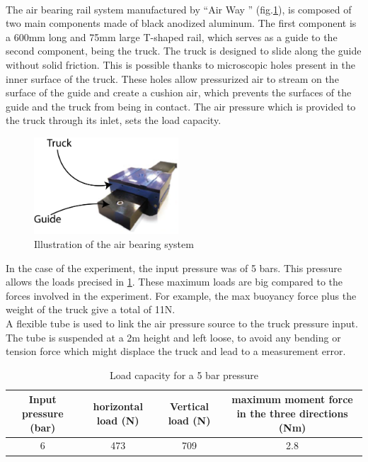 \paragraph{}
The air bearing rail system manufactured by "`Air Way \texttrademark"' (fig.\ref{fig:pic_frictionless}), is composed of two main components made of black anodized aluminum. The first component is a 600mm long and 75mm large T-shaped rail, which serves as a guide to the second component, being the truck. The truck is designed to slide along the guide without solid friction. This is possible thanks to microscopic holes present in the inner surface of the truck. These holes allow pressurized air to stream on the surface of the guide and create a cushion air, which prevents the surfaces of the guide and the truck from being in contact. The air pressure which is provided to the truck through its inlet, sets the load capacity.
\begin{figure}[H] %
	\centering%
	\includegraphics[width=0.48\textwidth]{figures/Chapter_1/Airbearing.png}
	\caption{Illustration of the air bearing system}
	\label{fig:pic_frictionless}
\end{figure}
In the case of the experiment, the input pressure was of 5 bars. This pressure allows the loads precised in \ref{tab:pressure_truck}. These maximum loads are big compared to the forces involved in the experiment. For example, the max buoyancy force plus the weight of the truck give a total of 11N.\\
A flexible tube is used to link the air pressure source to the truck pressure input. The tube is suspended at a 2m height and left loose, to avoid any bending or tension force which might displace the truck and lead to a measurement error.
\begin{table}[H]
	\centering
		\begin{adjustbox}{width=\textwidth}
			\begin{tabular}{|c|c|c|c|}
				\hline
				Input pressure (bar) & horizontal load (N)&Vertical load (N)& maximum moment force in the three directions (Nm) \\
				\hline
				6&473&709&2.8\\
				\hline
			\end{tabular}
		\end{adjustbox}
	\caption{Load capacity for a 5 bar pressure}
	\label{tab:pressure_truck}
\end{table}
